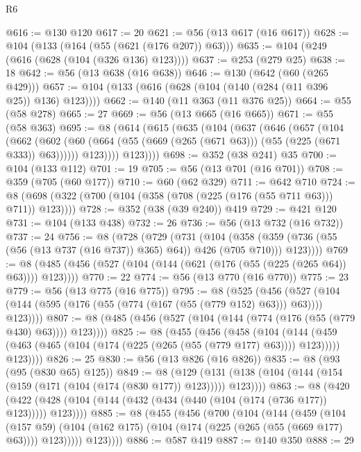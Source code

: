 \begin{lexlean}{R6}
\begin{coremodule}
{{{{{{{{{{{{{{{{{{{{@616 := @130 @120
@617 := 20
@621 := @56 (@13 @617 (@16 @617))
@628 := @104 (@133 (@164 (@55 (@621 (@176 @207)) @63)))
@635 := @104 (@249 (@616 (@628 (@104 (@326 @136) @123))))
@637 := @253 (@279 @25)
@638 := 18
@642 := @56 (@13 @638 (@16 @638))
@646 := @130 (@642 (@60 (@265 @429)))
@657 := @104 (@133 (@616 (@628 (@104 (@140 (@284 (@11 @396 @25)) @136) @123))))
@662 := @140 (@11 @363 (@11 @376 @25))
@664 := @55 (@58 @278)
@665 := 27
@669 := @56 (@13 @665 (@16 @665))
@671 := @55 (@58 @363)
@695 := @8
    (@614
      (@615
        (@635
          (@104
            (@637
              (@646
                (@657
                  (@104
                    (@662
                      (@602
                        (@60 (@664 (@55 (@669 (@265 (@671 @63))) (@55 (@225 (@671 @333)) @63))))))
                    @123))))
            @123))))
@698 := @352 (@38 @241) @35
@700 := @104 (@133 @112)
@701 := 19
@705 := @56 (@13 @701 (@16 @701))
@708 := @359 (@705 (@60 @177))
@710 := @60 (@62 @329)
@711 := @642 @710
@724 := @8 (@698 (@322 (@700 (@104 (@358 (@708 (@225 (@176 (@55 @711 @63))) @711)) @123))))
@728 := @352 (@38 (@39 @240)) @419
@729 := @421 @120
@731 := @104 (@133 @438)
@732 := 26
@736 := @56 (@13 @732 (@16 @732))
@737 := 24
@756 := @8
    (@728
      (@729
        (@731
          (@104
            (@358 (@359 (@736 (@55 (@56 (@13 @737 (@16 @737)) @365) @64)) @426 (@705 @710)))
            @123))))
@769 := @8 (@485 (@456 (@527 (@104 (@144 (@621 (@176 (@55 (@225 (@265 @64)) @63)))) @123))))
@770 := 22
@774 := @56 (@13 @770 (@16 @770))
@775 := 23
@779 := @56 (@13 @775 (@16 @775))
@795 := @8
    (@525
      (@456 (@527 (@104 (@144 (@595 (@176 (@55 (@774 (@167 (@55 (@779 @152) @63))) @63)))) @123))))
@807 := @8 (@485 (@456 (@527 (@104 (@144 (@774 (@176 (@55 (@779 @430) @63)))) @123))))
@825 := @8
    (@455
      (@456
        (@458
          (@104
            (@144 (@459 (@463 (@465 (@104 (@174 (@225 (@265 (@55 (@779 @177) @63)))) @123)))))
            @123))))
@826 := 25
@830 := @56 (@13 @826 (@16 @826))
@835 := @8 (@93 (@95 (@830 @65) @125))
@849 := @8
    (@129 (@131 (@138 (@104 (@144 (@154 (@159 (@171 (@104 (@174 (@830 @177)) @123))))) @123))))
@863 := @8
    (@420 (@422 (@428 (@104 (@144 (@432 (@434 (@440 (@104 (@174 (@736 @177)) @123))))) @123))))
@885 := @8
    (@455
      (@456
        (@700
          (@104
            (@144
              (@459
                (@104
                  (@157 @59)
                  (@104 (@162 @175) (@104 (@174 (@225 (@265 (@55 (@669 @177) @63)))) @123)))))
            @123))))
@886 := @587 @419
@887 := @140 @350
@888 := 29
}}}}}}}}}}}}}}}}}}}}
\end{coremodule}
\end{lexlean}

